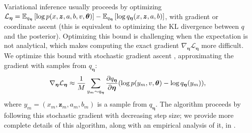 Variational inference usually proceeds by optimizing $\mathcal{L}_{\bm
  \eta} = \mathbb{E}_{q_{\bm
  \eta}}\left[ \log p(x, \bm z, a, b, v, \bm \theta) \right] - \mathbb{E}_{q_{\bm \eta}}\left[ \log q_{\bm \eta}(x, \bm z, a, b) \right]$,
with gradient or coordinate ascent (this is equivalent to optimizing
the KL divergence between $q$ and the posterior).  Optimizing this
bound is challenging when the expectation is not analytical, which
makes computing the exact gradient $\nabla_{\bm \eta} \mathcal{L}_{\bm
  \eta}$ more difficult.  We optimize this bound with stochastic
gradient ascent \cite{robbins:1951,bottou:2004}, approximating the
gradient with samples from $q_{\bm \eta}$:
\begin{align}
\nabla_{\bm \eta} \mathcal{L}_{\bm \eta}
  \approx \frac{1}{M} \sum_{y_m \sim q_{\bm \eta}}
    \frac{\partial q_{\bm \eta}}{\partial \bm \eta}( \log p(y_m, v, \bm \theta) - \log q_{\bm \eta}(y_m)
    ),
    \label{eq:approx_elbo_gradient}
\end{align}
where $y_m=(x_m, \bm z_m, a_m, b_m)$ is a sample from $q_{\bm
  \eta}$. The algorithm proceeds by following this stochastic gradient
with decreasing step size; we provide more complete details of this
algorithm, along with an empirical analysis of it, in
.



